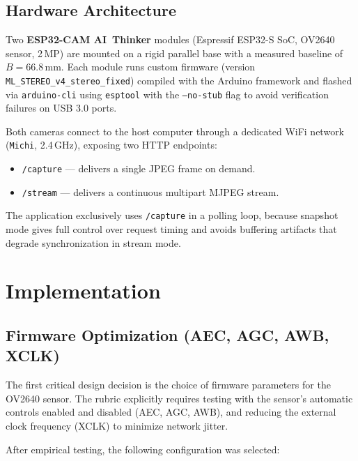 \documentclass[12pt, a4paper]{article}
\begin{document}
\subsection{Hardware Architecture}

Two \textbf{ESP32-CAM AI~Thinker} modules (Espressif ESP32-S SoC, OV2640 sensor,
2\,MP) are mounted on a rigid parallel base with a measured baseline of
$B = 66.8$\,mm. Each module runs custom firmware (version
\texttt{ML\_STEREO\_v4\_stereo\_fixed}) compiled with the Arduino framework and
flashed via \texttt{arduino-cli} using \texttt{esptool} with the
\texttt{--no-stub} flag to avoid verification failures on USB 3.0 ports.

Both cameras connect to the host computer through a dedicated WiFi network
(\texttt{Michi}, 2.4\,GHz), exposing two HTTP endpoints:
\begin{itemize}[leftmargin=2em]
  \item \texttt{/capture} --- delivers a single JPEG frame on demand.
  \item \texttt{/stream}  --- delivers a continuous multipart MJPEG stream.
\end{itemize}
The application exclusively uses \texttt{/capture} in a polling loop, because
snapshot mode gives full control over request timing and avoids buffering artifacts
that degrade synchronization in stream mode.

\section{Implementation}

\subsection{Firmware Optimization (AEC, AGC, AWB, XCLK)}

The first critical design decision is the choice of firmware parameters for the
OV2640 sensor. The rubric explicitly requires testing with the sensor's automatic
controls enabled and disabled (AEC, AGC, AWB), and reducing the external clock
frequency (XCLK) to minimize network jitter.

After empirical testing, the following configuration was selected:
\end{document}
